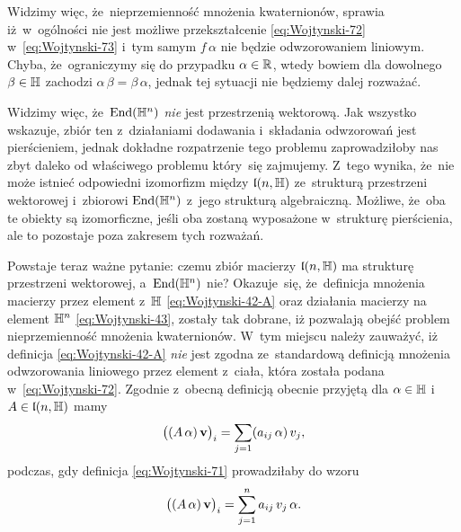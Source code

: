 \documentclass[a4paper,11pt]{article}
\begin{document}
Widzimy więc, że~nieprzemienność mnożenia kwaternionów, sprawia
iż~w~ogólności nie jest możliwe przekształcenie \eqref{eq:Wojtynski-72}
w~\eqref{eq:Wojtynski-73} i~tym samym $f \, \alpha$ nie będzie odwzorowaniem
liniowym. Chyba, że~ograniczymy się do przypadku $\alpha \in \mathbb{R}$, wtedy bowiem
dla dowolnego $\beta \in \mathbb{H}$ zachodzi $\alpha \, \beta = \beta \, \alpha$, jednak tej sytuacji
nie będziemy dalej rozważać.

Widzimy więc, że~$\mathrm{End}( \mathbb{H}^{ n } )$ \textit{nie} jest przestrzenią
wektorową. Jak wszystko wskazuje, zbiór ten z~działaniami dodawania
i~składania odwzorowań jest pierścieniem, jednak dokładne rozpatrzenie tego
problemu zaprowadziłoby nas zbyt daleko od właściwego problemu który~się
zajmujemy. Z~tego wynika, że~nie może istnieć odpowiedni izomorfizm między
$\mathfrak{l}( n, \mathbb{H} )$ ze~strukturą przestrzeni wektorowej
i~zbiorowi $\mathrm{End}( \mathbb{H}^{ n } )$ z~jego strukturą algebraiczną. Możliwe,
że~oba te obiekty są izomorficzne, jeśli oba zostaną wyposażone w~strukturę
pierścienia, ale to pozostaje poza zakresem tych rozważań.

Powstaje teraz ważne pytanie: czemu zbiór macierzy $\mathfrak{l}( n, \mathbb{H} )$ ma
strukturę przestrzeni wektorowej, a~$\mathrm{End}( \mathbb{H}^{ n } )$ nie? Okazuje~się,
że~definicja mnożenia macierzy przez element z~$\mathbb{H}$
\eqref{eq:Wojtynski-42-A} oraz działania macierzy na element $\mathbb{H}^{ n }$
\eqref{eq:Wojtynski-43}, zostały tak dobrane, iż pozwalają obejść problem
nieprzemienność mnożenia kwaternionów. W~tym miejscu należy zauważyć, iż
definicja \eqref{eq:Wojtynski-42-A} \textit{nie} jest zgodna ze~standardową
definicją mnożenia odwzorowania liniowego przez element z~ciała, która
została podana w~\eqref{eq:Wojtynski-72}. Zgodnie z~obecną definicją
obecnie przyjętą dla $\alpha \in \mathbb{H}$ i~$A \in \mathfrak{l}( n, \mathbb{H} )$ mamy
\begin{equation}
  \label{eq:Wojtynski-77}
  \big( ( A \, \alpha ) \, \mathbf{v} \big)_{ i } =
  \sum_{ j = 1 } ( a_{ i j } \, \alpha ) \, v_{ j },
\end{equation}
podczas, gdy definicja \eqref{eq:Wojtynski-71} prowadziłaby do wzoru
\begin{equation}
  \label{eq:Wojtynsk-78}
  \big( ( A \, \alpha ) \, \mathbf{v} \big)_{ i } =
  \sum_{ j = 1 }^{ n } a_{ i j } \, v_{ j } \, \alpha.
\end{equation}
\end{document}
